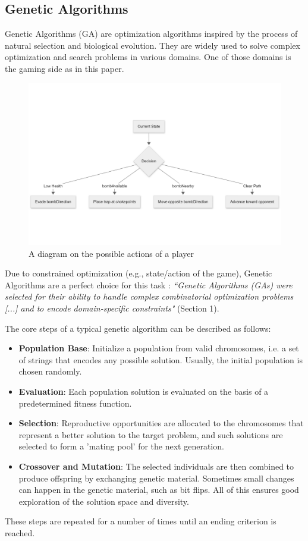 \documentclass[sigconf]{acmart} %
\begin{document}
\subsection{Genetic Algorithms}
Genetic Algorithms (GA) are optimization algorithms inspired by the process of natural selection and biological evolution. They are widely used to solve complex optimization and search problems in various domains. 
One of those domains is the gaming side as in this paper. 
\begin{figure}
      \centering
      \includegraphics[width = 1.25\linewidth]{pictures/possibleActionsPlayer.png}
      \caption{\label{fig:possibleActionsPlayer}A diagram on the possible actions of a player}
      \end{figure}
Due to constrained optimization (e.g., state/action of the game), Genetic Algorithms are a perfect choice for this task \cite{popescu2025}: 
\textit{``Genetic Algorithms (GAs) were selected for their ability to handle complex combinatorial optimization problems [...] and to encode domain-specific constraints"} (Section 1).

The core steps of a typical genetic algorithm can be described as follows:
\begin{itemize}
    \item \textbf{Population Base}: Initialize a population from valid chromosomes, i.e. a set of strings that encodes any possible solution. Usually, the initial population is chosen randomly.
    \item \textbf{Evaluation}: Each population solution is evaluated on the basis of a predetermined fitness function.
    \item \textbf{Selection}: Reproductive opportunities are allocated to the chromosomes that represent a better solution to the target problem, and such solutions are selected to form a 'mating pool' for the next generation.
    \item \textbf{Crossover and Mutation}: The selected individuals are then combined to produce offspring by exchanging genetic material. Sometimes small changes can happen in the genetic material, such as bit flips. All of this ensures good exploration of the solution space and diversity.
    
\end{itemize}
These steps are repeated for a number of times until an ending criterion is reached.
\end{document}
